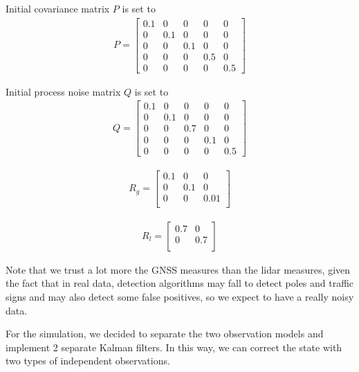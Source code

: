 \documentclass[conference]{IEEEtran}
\begin{document}
\noindent Initial covariance matrix $P$ is set to
\begin{align*}
   P = \begin{bmatrix}
    0.1 & 0 & 0 & 0 & 0 \\ 
    0 & 0.1 & 0 & 0 & 0 \\
    0 & 0 & 0.1 & 0 & 0 \\
    0 & 0 & 0 & 0.5 & 0 \\
    0 & 0 & 0 & 0 & 0.5
    \end{bmatrix}
\end{align*}

\noindent Initial process noise matrix $Q$ is set to
\begin{align*}
   Q = \begin{bmatrix}
    0.1 & 0 & 0 & 0 & 0 \\ 
    0 & 0.1 & 0 & 0 & 0 \\
    0 & 0 & 0.7 & 0 & 0 \\
    0 & 0 & 0 & 0.1 & 0 \\
    0 & 0 & 0 & 0 & 0.5
    \end{bmatrix}
\end{align*}

\begin{align*}
   R_g = \begin{bmatrix}
    0.1 & 0 & 0 \\ 
    0 & 0.1 & 0 \\
    0 & 0 & 0.01  \\
    \end{bmatrix}
\end{align*}


\begin{align*}
   R_l = \begin{bmatrix}
    0.7 & 0 \\ 
    0 & 0.7 \\
    \end{bmatrix}
\end{align*}

\noindent Note that we trust a lot more the GNSS measures than the lidar measures, given the fact that in real data, detection algorithms may fall to detect poles and traffic signs and may also detect some false positives, so we expect to have a really noisy data.

\noindent For the simulation, we decided to separate the two observation models and implement 2 separate Kalman filters. In this way, we can correct the state with two types of independent observations.
\end{document}
